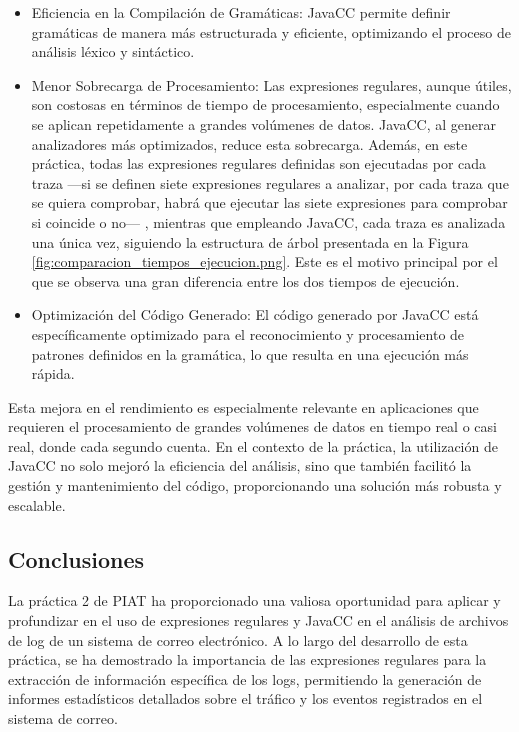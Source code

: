 \begin{itemize}
\item Eficiencia en la Compilación de Gramáticas: JavaCC permite definir gramáticas de manera más estructurada y eficiente, optimizando el proceso de análisis léxico y sintáctico.
\item Menor Sobrecarga de Procesamiento: Las expresiones regulares, aunque útiles, son costosas en términos de tiempo de procesamiento, especialmente cuando se aplican repetidamente a grandes volúmenes de datos. JavaCC, al generar analizadores más optimizados, reduce esta sobrecarga. Además, en este práctica, todas las expresiones regulares definidas son ejecutadas por cada traza ---si se definen siete expresiones regulares a analizar, por cada traza que se quiera comprobar, habrá que ejecutar las siete expresiones para comprobar si coincide o no--- , mientras que empleando JavaCC, cada traza es analizada una única vez, siguiendo la estructura de árbol presentada en la Figura \ref{fig:comparacion_tiempos_ejecucion.png}. Este es el motivo principal por el que se observa una gran diferencia entre los dos tiempos de ejecución.
\item Optimización del Código Generado: El código generado por JavaCC está específicamente optimizado para el reconocimiento y procesamiento de patrones definidos en la gramática, lo que resulta en una ejecución más rápida.
\end{itemize}

Esta mejora en el rendimiento es especialmente relevante en aplicaciones que requieren el procesamiento de grandes volúmenes de datos en tiempo real o casi real, donde cada segundo cuenta. En el contexto de la práctica, la utilización de JavaCC no solo mejoró la eficiencia del análisis, sino que también facilitó la gestión y mantenimiento del código, proporcionando una solución más robusta y escalable.

\subsection{Conclusiones}

\noindent La práctica 2 de PIAT ha proporcionado una valiosa oportunidad para aplicar y profundizar en el uso de expresiones regulares y JavaCC en el análisis de archivos de log de un sistema de correo electrónico. A lo largo del desarrollo de esta práctica, se ha demostrado la importancia de las expresiones regulares para la extracción de información específica de los logs, permitiendo la generación de informes estadísticos detallados sobre el tráfico y los eventos registrados en el sistema de correo.

